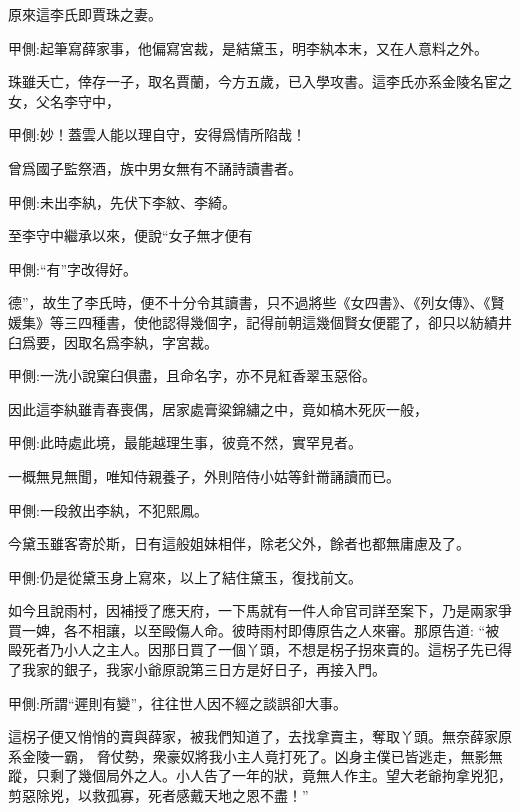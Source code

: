 \begin{parag}
    原來這李氏即賈珠之妻。\begin{note}甲側:起筆寫薛家事，他偏寫宮裁，是結黛玉，明李紈本末，又在人意料之外。\end{note}珠雖夭亡，倖存一子，取名賈蘭，今方五歲，已入學攻書。這李氏亦系金陵名宦之女，父名李守中，\begin{note}甲側:妙！蓋雲人能以理自守，安得爲情所陷哉！\end{note}曾爲國子監祭酒，族中男女無有不誦詩讀書者。\begin{note}甲側:未出李紈，先伏下李紋、李綺。\end{note}至李守中繼承以來，便說“女子無才便有\begin{note}甲側:“有”字改得好。\end{note}德”，故生了李氏時，便不十分令其讀書，只不過將些《女四書》、《列女傳》、《賢媛集》等三四種書，使他認得幾個字，記得前朝這幾個賢女便罷了，卻只以紡績井臼爲要，因取名爲李紈，字宮裁。\begin{note}甲側:一洗小說窠臼俱盡，且命名字，亦不見紅香翠玉惡俗。\end{note}因此這李紈雖青春喪偶，居家處膏粱錦繡之中，竟如槁木死灰一般，\begin{note}甲側:此時處此境，最能越理生事，彼竟不然，實罕見者。\end{note}一概無見無聞，唯知侍親養子，外則陪侍小姑等針黹誦讀而已。\begin{note}甲側:一段敘出李紈，不犯熙鳳。\end{note}今黛玉雖客寄於斯，日有這般姐妹相伴，除老父外，餘者也都無庸慮及了。\begin{note}甲側:仍是從黛玉身上寫來，以上了結住黛玉，復找前文。\end{note}
\end{parag}


\begin{parag}
    如今且說雨村，因補授了應天府，一下馬就有一件人命官司詳至案下，乃是兩家爭買一婢，各不相讓，以至毆傷人命。彼時雨村即傳原告之人來審。那原告道: “被毆死者乃小人之主人。因那日買了一個丫頭，不想是柺子拐來賣的。這柺子先已得了我家的銀子，我家小爺原說第三日方是好日子，再接入門。\begin{note}甲側:所謂“遲則有變”，往往世人因不經之談誤卻大事。\end{note}這柺子便又悄悄的賣與薛家，被我們知道了，去找拿賣主，奪取丫頭。無奈薛家原系金陵一霸， 脅仗勢，衆豪奴將我小主人竟打死了。凶身主僕已皆逃走，無影無蹤，只剩了幾個局外之人。小人告了一年的狀，竟無人作主。望大老爺拘拿兇犯，剪惡除兇，以救孤寡，死者感戴天地之恩不盡！”
\end{parag}



